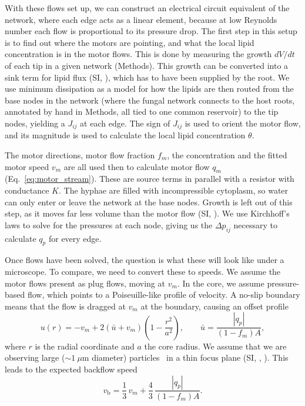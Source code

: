 With these flows set up, we can construct an electrical circuit equivalent of the network, where each edge acts as a linear element, because at low Reynolds number each flow is proportional to its pressure drop. The first step in this setup is to find out where the motors are pointing, and what the local lipid concentration is in the motor flows. This is done by measuring the growth $dV/dt$ of each tip in a given network (Methods). This growth can be converted into a sink term for lipid flux (SI, ), which has to have been supplied by the root. We use minimum dissipation as a model for how the lipids are then routed from the base nodes in the network (where the fungal network connects to the host roots, annotated by hand in Methods, all tied to one common reservoir) to the tip nodes, yielding a $J_{ij}$ at each edge. The sign of $J_{ij}$ is used to orient the motor flow, and its magnitude is used to calculate the local lipid concentration $\theta$.

The motor directions, motor flow fraction $f_m$, the concentration and the fitted motor speed $v_m$ are all used then to calculate motor flow $q_m$ (Eq.~\eqref{eq:motor_stream}). These are source terms in parallel with a resistor with conductance $K$. The hyphae are filled with incompressible cytoplasm, so water can only enter or leave the network at the base nodes. Growth is left out of this step, as it moves far less volume than the motor flow (SI, ). We use Kirchhoff's laws to solve for the pressures at each node, giving us the $\Delta p_{ij}$ necessary to calculate $q_p$ for every edge.

Once flows have been solved, the question is what these will look like under a microscope. To compare, we need to convert these to speeds. We assume the motor flows present as plug flows, moving at $v_m$. In the core, we assume pressure-based flow, which points to a Poiseuille-like profile of velocity. A no-slip boundary means that the flow is dragged at $v_m$ at the boundary, causing an offset profile
\begin{equation}
\label{eq:core_profile}
u(r) = -v_m + 2\left(\bar{u} + v_m\right)\left(1 - \frac{r^2}{a^2}\right), \qquad \bar{u} = \frac{|q_p|}{(1-f_m) A},
\end{equation}
where $r$ is the radial coordinate and $a$ the core radius. We assume that we are observing large (${\sim}1~\mu$m diameter) particles~\cite{sister_lipid_droplets_inprep} in a thin focus plane (SI, , ). This leads to the expected backflow speed
\begin{equation}
\label{eq:backflow_speed}
v_\mathrm{b} = \frac{1}{3}\,v_m + \frac{4}{3}\,\frac{|q_p|}{(1-f_m) A}.
\end{equation}

